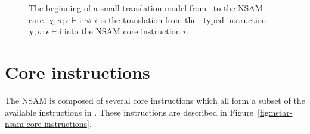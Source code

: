 \begin{figure}[htb]
  \centering


  \caption{The beginning of a small translation model from \nstar\ to the NSAM core. \textbf{$\chi;\sigma;\epsilon\vdash\text{i} \rightsquigarrow \textit{i}$} is the translation from the \nstar\ typed instruction \textbf{$\chi;\sigma;\epsilon\vdash\text{i}$} into the NSAM core instruction \textbf{$\textit{i}$}.}
  \label{fig:nstar-nsam-translation-nstar-nsam}
\end{figure}

\section{Core instructions}\label{sec:nstar-nsam-core}

The NSAM is composed of several core instructions which all form a subset of the available instructions in \nstar.
These instructions are described in Figure~\ref{fig:nstar-nsam-core-instructions}.

